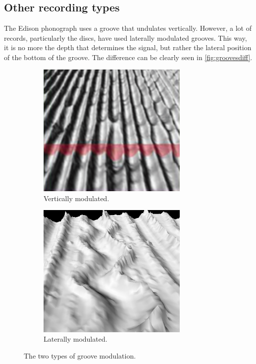 \subsection{Other recording types}

The Edison phonograph uses a groove that undulates vertically. However, a lot of records, particularly the discs, have used laterally modulated grooves. This way, it is no more the depth that determines the signal, but rather the lateral position of the bottom of the groove. The difference can be clearly seen in \autoref{fig:groovesdiff}.

\begin{figure}[!ht]
    \begin{subfigure}[b]{0.49\textwidth}
    \centering
    \includegraphics[width=0.8\textwidth]{images/grooves-vertical}
    \caption{Vertically modulated.}
    \label{fig:groovesvert}
    \end{subfigure}
    \begin{subfigure}[b]{0.49\textwidth}
    \centering
    \includegraphics[width=0.8\textwidth]{images/grooves-lateral}
    \caption{Laterally modulated.}
    \label{fig:grooveslat}
    \end{subfigure}
    \caption{The two types of groove modulation.}
    \label{fig:groovesdiff}
\end{figure}

